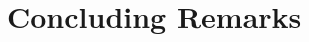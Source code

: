 \documentclass[12pt]{article}%
\begin{document}

 

\section{Concluding Remarks}\label{conclusion}

\end{document}
